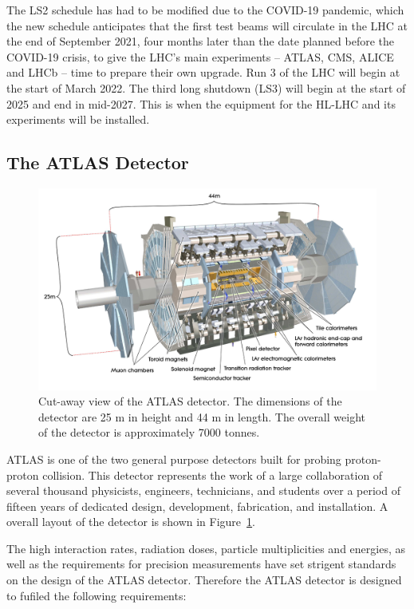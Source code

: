 	The LS2 schedule has had to be modified due to the COVID-19 pandemic, 
	which the new schedule anticipates that the first test beams will 
	circulate in the LHC 
	at the end of September 2021, four months later than the date 
	planned before the COVID-19 crisis, 
	to give the LHC’s main experiments – ATLAS, CMS, ALICE and LHCb – 
	time to prepare their own upgrade. 
	Run 3 of the LHC will begin at the start of March 2022.
	The third long shutdown (LS3) will begin at the 
	start of 2025 and end in mid-2027. 
	This is when the equipment for the HL-LHC and 
	its experiments will be installed. 
	





\subsection{The ATLAS Detector}

\begin{figure}[bht]
	\begin{centering}	
	\includegraphics[width=.65\textwidth]{Detector_plots/Cut-away-view-of-the-ATLAS-detector.png}
	\caption{Cut-away view of the ATLAS detector. 
	The dimensions of the detector are 25 m in
	height and 44 m in length. The overall weight 
	of the detector is approximately 7000 tonnes.
		}
	\label{fig:ATLAS_cut_away}
	\end{centering}
\end{figure}

ATLAS is one of the 
two general purpose detectors built for probing proton-proton 
collision. This detector represents the work of a large collaboration 
of several thousand physicists, engineers, technicians,
and students over a period of fifteen years of dedicated 
design, development, fabrication, and installation.
A overall layout of the detector is shown in Figure~\ref{fig:ATLAS_cut_away}.

The high interaction rates, radiation doses, particle 
multiplicities and energies, as well as the
requirements for precision measurements have set strigent
standards on the design of the ATLAS detector. 
Therefore the ATLAS detector is designed to fufiled the following 
requirements:

